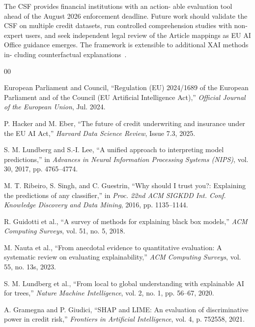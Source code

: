 \documentclass[conference]{IEEEtran}
\begin{document}
The CSF provides financial institutions with an action- able evaluation tool ahead of the August 2026 enforcement deadline. Future work should validate the CSF on multiple credit datasets, run controlled comprehension studies with non-expert users, and seek independent legal review of the Article mappings as EU AI Office guidance emerges. The framework is extensible to additional XAI methods in- cluding counterfactual explanations~\cite{b13}.

\begin{thebibliography}{00}

European Parliament and Council, ``Regulation (EU) 2024/1689 of the European Parliament and of the Council (EU Artificial Intelligence Act),'' \textit{Official Journal of the European Union}, Jul. 2024.

P. Hacker and M. Eber, ``The future of credit underwriting and insurance under the EU AI Act,'' \textit{Harvard Data Science Review}, Issue 7.3, 2025.

S. M. Lundberg and S.-I. Lee, ``A unified approach to interpreting model predictions,'' in \textit{Advances in Neural Information Processing Systems (NIPS)}, vol. 30, 2017, pp. 4765--4774.

M. T. Ribeiro, S. Singh, and C. Guestrin, ``Why should I trust you?: Explaining the predictions of any classifier,'' in \textit{Proc. 22nd ACM SIGKDD Int. Conf. Knowledge Discovery and Data Mining}, 2016, pp. 1135--1144.

R. Guidotti et al., ``A survey of methods for explaining black box models,'' \textit{ACM Computing Surveys}, vol. 51, no. 5, 2018.

M. Nauta et al., ``From anecdotal evidence to quantitative evaluation: A systematic review on evaluating explainability,'' \textit{ACM Computing Surveys}, vol. 55, no. 13s, 2023.

S. M. Lundberg et al., ``From local to global understanding with explainable AI for trees,'' \textit{Nature Machine Intelligence}, vol. 2, no. 1, pp. 56--67, 2020.

A. Gramegna and P. Giudici, ``SHAP and LIME: An evaluation of discriminative power in credit risk,'' \textit{Frontiers in Artificial Intelligence}, vol. 4, p. 752558, 2021.


\end{thebibliography}
\end{document}
